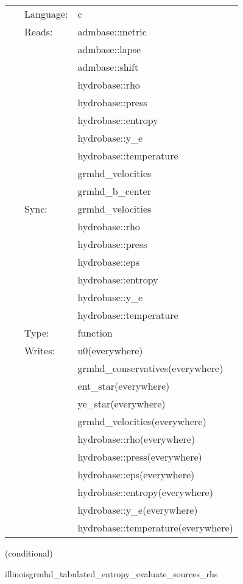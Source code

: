  \begin{tabular*}{160mm}{cll} 
~ & Language:  & c \\ 
~ & Reads:  & admbase::metric \\ 
~& ~ &admbase::lapse\\ 
~& ~ &admbase::shift\\ 
~& ~ &hydrobase::rho\\ 
~& ~ &hydrobase::press\\ 
~& ~ &hydrobase::entropy\\ 
~& ~ &hydrobase::y\_e\\ 
~& ~ &hydrobase::temperature\\ 
~& ~ &grmhd\_velocities\\ 
~& ~ &grmhd\_b\_center\\ 
~ & Sync:  & grmhd\_velocities \\ 
~& ~ &hydrobase::rho\\ 
~& ~ &hydrobase::press\\ 
~& ~ &hydrobase::eps\\ 
~& ~ &hydrobase::entropy\\ 
~& ~ &hydrobase::y\_e\\ 
~& ~ &hydrobase::temperature\\ 
~ & Type:  & function \\ 
~ & Writes:  & u0(everywhere) \\ 
~& ~ &grmhd\_conservatives(everywhere)\\ 
~& ~ &ent\_star(everywhere)\\ 
~& ~ &ye\_star(everywhere)\\ 
~& ~ &grmhd\_velocities(everywhere)\\ 
~& ~ &hydrobase::rho(everywhere)\\ 
~& ~ &hydrobase::press(everywhere)\\ 
~& ~ &hydrobase::eps(everywhere)\\ 
~& ~ &hydrobase::entropy(everywhere)\\ 
~& ~ &hydrobase::y\_e(everywhere)\\ 
~& ~ &hydrobase::temperature(everywhere)\\ 
\end{tabular*} 


\vspace{5mm}

   (conditional) 

\hspace{5mm} illinoisgrmhd\_tabulated\_entropy\_evaluate\_sources\_rhs 

